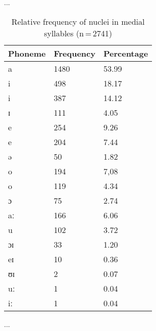 ...

\begin{table}[hp]\centering
\caption[Relative frequency of nuclei in medial syllables]{Relative frequency of nuclei in medial syllables (n\,=\,2741)}
\begin{tabu} to 0.5\textwidth{X X[c] X[c]}
\tableheaderfont\toprule
Phoneme
	& Frequency
	& Percentage
	\\
	
\toprule

a
	& 1480
	& 53.99\pct
	\\
i
	& 498
	& 18.17\pct
\\
\rowfont{\footnotesize\itshape}
\raggedleft
i
	& 387
	& 14.12\pct
	\\
\rowfont{\footnotesize\itshape}
\raggedleft
ɪ
	& 111
	& 4.05\pct
	\\
e
	& 254
	& 9.26\pct
	\\
\rowfont{\footnotesize\itshape}
\raggedleft
e
	& 204
	& 7.44\pct
	\\
\rowfont{\footnotesize\itshape}
\raggedleft
ə
	& 50
	& 1.82\pct
	\\
o
	& 194
	& 7,08
	\\
\rowfont{\footnotesize\itshape}
\raggedleft
o
	& 119
	& 4.34\pct
	\\
\rowfont{\footnotesize\itshape}
\raggedleft
ɔ
	& 75
	& 2.74\pct
	\\
aː
	& 166
	& 6.06\pct
	\\
u
	& 102
	& 3.72\pct
	\\
ɔɪ
	& 33
	& 1.20\pct
	\\
eɪ
	& 10
	& 0.36\pct
	\\
ʊɪ
	& 2
	& 0.07\pct
	\\
uː
	& 1
	& 0.04\pct
	\\
iː
	& 1
	& 0.04\pct
	\\

\bottomrule
\end{tabu}
\label{tab:midnuc}
\end{table}

...

